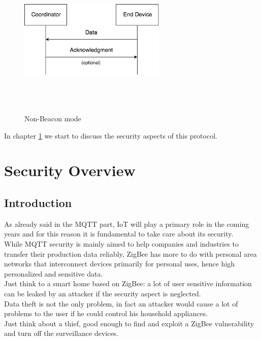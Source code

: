 \documentclass[12pt]{report}
\begin{document}
{{\begin{itemize}
\begin{figure}[H]
\includegraphics[width=7cm,height=7.5cm,keepaspectratio]{zigbee_nonbeaconmode}
\centering
\caption{Non-Beacon mode}
\end{figure}

\end{itemize}
\bigskip
In chapter \ref{chap:zigbeesecchap} we start to discuss the security aspects of this protocol.\\

\chapter{Security Overview}
\label{chap:zigbeesecchap}

\section{Introduction}
\bigskip
As already said in the MQTT part, IoT will play a primary role in the coming years and for this reason it is fundamental to take care about its security.\\
While MQTT security is mainly aimed to help companies and industries to transfer their production data reliably, ZigBee has more to do with personal area networks that interconnect devices primarily for personal uses, hence high personalized and sensitive data.\\
Just think to a smart home based on ZigBee: a lot of user sensitive information can be leaked by an attacker if the security aspect is neglected.\\
Data theft is not the only problem, in fact an attacker would cause a lot of problems to the user if he could control his household appliances.\\
Just think about a thief, good enough to find and exploit a ZigBee vulnerability and turn off the surveillance devices.\\\\

}}
\end{document}
